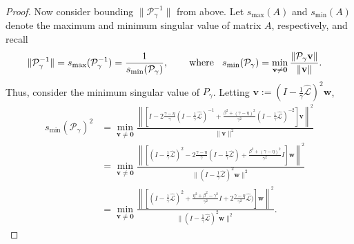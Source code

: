 \documentclass[review]{siamart}
\begin{document}
\begin{proof}
Now consider bounding $\|\mathcal{P}_\gamma^{-1}\|$ from above. Let $s_{\max}(A)$
and $s_{\min}(A)$ denote the maximum and minimum singular value of matrix $A$,
respectively, and recall
%
\begin{align*}
\|\mathcal{P}_\gamma^{-1}\| = s_{\max}(\mathcal{P}_\gamma^{-1})
	& = \frac{1}{s_{\min}(\mathcal{P}_\gamma)}, \hspace{5ex}\textnormal{where}\hspace{2ex}
s_{\min}(\mathcal{P}_\gamma) =
	\min_{\mathbf{v}\neq\mathbf{0}} \frac{\|\mathcal{P}_\gamma\mathbf{v}\|}{\|\mathbf{v}\|}.
\end{align*}
%
Thus, consider the minimum singular value of $P_\gamma$. Letting $\mathbf{v} :=
(I - \tfrac{1}{\gamma}\widehat{\mathcal{L}})^{2}\mathbf{w}$,
%
\begin{align}\nonumber
s_{\min}(\mathcal{P}_\gamma)^2 & = \min_{\mathbf{v}\neq\mathbf{0}}
	\frac{\left\| \left[I - 2\frac{\gamma-\eta}{\gamma}(I - \tfrac{1}{\gamma}
		\widehat{\mathcal{L}})^{-1} + \frac{\beta^2 + (\gamma-\eta)^2}{\gamma^2}
		(I - \tfrac{1}{\gamma}\widehat{\mathcal{L}})^{-2}\right]\mathbf{v} \right\|^2}
	{\|\mathbf{v}\|^2} \\
& = \min_{\mathbf{v}\neq\mathbf{0}}
	\frac{\left\| \left[(I - \tfrac{1}{\gamma}\widehat{\mathcal{L}})^{2} - 2\frac{\gamma-\eta}{\gamma}
		(I - \tfrac{1}{\gamma} \widehat{\mathcal{L}}) + \frac{\beta^2 + (\gamma-\eta)^2}{\gamma^2} I
		\right]\mathbf{w} \right\|^2}
	{\|(I - \tfrac{1}{\gamma}\widehat{\mathcal{L}})^{2}\mathbf{w}\|^2} \nonumber\\
& = \min_{\mathbf{v}\neq\mathbf{0}}
	\frac{\left\| \left[(I - \tfrac{1}{\gamma}\widehat{\mathcal{L}})^{2} + 
		\tfrac{\eta^2+\beta^2-\gamma^2}{\gamma^2} I + 2\frac{\gamma-\eta}{\gamma^2}
		\widehat{\mathcal{L}}) \right]\mathbf{w} \right\|^2}
	{\|(I - \tfrac{1}{\gamma}\widehat{\mathcal{L}})^{2}\mathbf{w}\|^2}.\label{eq:smin0}
\end{align}
%


\end{proof}
\end{document}
